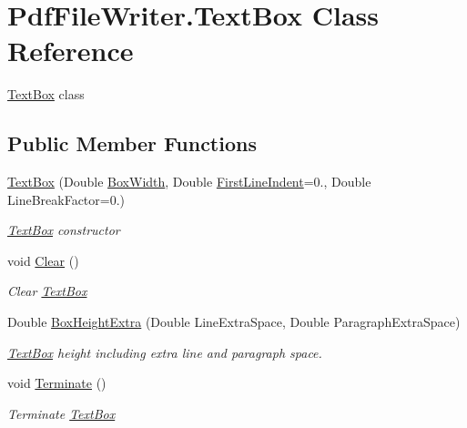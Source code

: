 \hypertarget{class_pdf_file_writer_1_1_text_box}{}\section{Pdf\+File\+Writer.\+Text\+Box Class Reference}
\label{class_pdf_file_writer_1_1_text_box}


\hyperlink{class_pdf_file_writer_1_1_text_box}{Text\+Box} class  


\subsection*{Public Member Functions}
\begin{DoxyCompactItemize}
\item 
\hyperlink{class_pdf_file_writer_1_1_text_box_aeb77c7d15cd40969ca6d955cb447a672}{Text\+Box} (Double \hyperlink{class_pdf_file_writer_1_1_text_box_a34a203840d14e36e0ae0d80b3c2ee1c7}{Box\+Width}, Double \hyperlink{class_pdf_file_writer_1_1_text_box_a2fb4e8a5bcb730df655e813fe5fd2cf1}{First\+Line\+Indent}=0., Double Line\+Break\+Factor=0.)
\begin{DoxyCompactList}\small\item\em \hyperlink{class_pdf_file_writer_1_1_text_box}{Text\+Box} constructor \end{DoxyCompactList}\item 
void \hyperlink{class_pdf_file_writer_1_1_text_box_a1541fa5d489fc23c399fa4e0fca79b39}{Clear} ()
\begin{DoxyCompactList}\small\item\em Clear \hyperlink{class_pdf_file_writer_1_1_text_box}{Text\+Box} \end{DoxyCompactList}\item 
Double \hyperlink{class_pdf_file_writer_1_1_text_box_abafae1b44cdc843c7f7b9c083d5e6183}{Box\+Height\+Extra} (Double Line\+Extra\+Space, Double Paragraph\+Extra\+Space)
\begin{DoxyCompactList}\small\item\em \hyperlink{class_pdf_file_writer_1_1_text_box}{Text\+Box} height including extra line and paragraph space. \end{DoxyCompactList}\item 
void \hyperlink{class_pdf_file_writer_1_1_text_box_a992008465b44d418d7dbf61a7e388d09}{Terminate} ()
\begin{DoxyCompactList}\small\item\em Terminate \hyperlink{class_pdf_file_writer_1_1_text_box}{Text\+Box} \end{DoxyCompactList}\item 

\end{DoxyCompactItemize}
